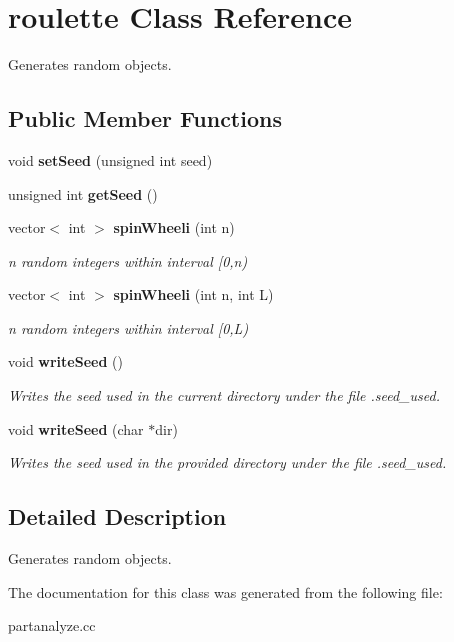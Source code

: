 \section{roulette Class Reference}
\label{classroulette}
Generates random objects.  


\subsection*{Public Member Functions}
\begin{CompactItemize}
\item 
void {\bf set\-Seed} (unsigned int seed)\label{classroulette_a1}

\item 
unsigned int {\bf get\-Seed} ()\label{classroulette_a2}

\item 
vector$<$ int $>$ {\bf spin\-Wheeli} (int n)\label{classroulette_a3}

\begin{CompactList}\small\item\em n random integers within interval [0,n) \item\end{CompactList}\item 
vector$<$ int $>$ {\bf spin\-Wheeli} (int n, int L)\label{classroulette_a4}

\begin{CompactList}\small\item\em n random integers within interval [0,L) \item\end{CompactList}\item 
void {\bf write\-Seed} ()\label{classroulette_a5}

\begin{CompactList}\small\item\em Writes the seed used in the current directory under the file .seed\_\-used. \item\end{CompactList}\item 
void {\bf write\-Seed} (char $\ast$dir)\label{classroulette_a6}

\begin{CompactList}\small\item\em Writes the seed used in the provided directory under the file .seed\_\-used. \item\end{CompactList}\end{CompactItemize}


\subsection{Detailed Description}
Generates random objects. 



The documentation for this class was generated from the following file:\begin{CompactItemize}
\item 
partanalyze.cc\end{CompactItemize}

